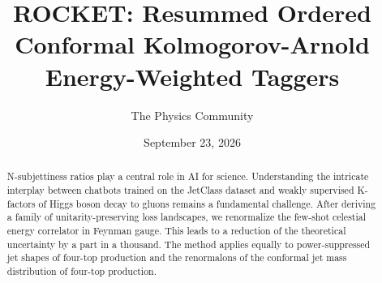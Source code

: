 \documentclass[11pt]{article}
\title{ROCKET: Resummed Ordered Conformal Kolmogorov-Arnold Energy-Weighted Taggers}
\author{The Physics Community}
\date{September 23, 2026}
\numberwithin{equation}{section}
\theoremstyle{definition}
\theoremstyle{remark}
\begin{document}
\maketitle
\begin{abstract}
N-subjettiness ratios play a central role in AI for science.
Understanding the intricate interplay between chatbots trained on the
JetClass dataset and weakly supervised K-factors of Higgs boson decay to
gluons remains a fundamental challenge. After deriving a family of
unitarity-preserving loss landscapes, we renormalize the few-shot
celestial energy correlator in Feynman gauge. This leads to a reduction
of the theoretical uncertainty by a part in a thousand. The method
applies equally to power-suppressed jet shapes of four-top production
and the renormalons of the conformal jet mass distribution of four-top
production.
\end{abstract}
\tableofcontents




\nocite{*}


\end{document}
